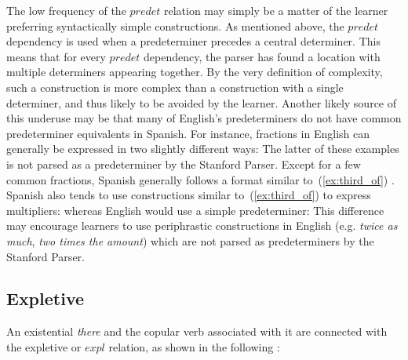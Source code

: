 \documentclass[main.tex]{subfiles}
\begin{document}
The low frequency of the $predet$ relation may simply be a matter of the learner preferring syntactically simple constructions. As mentioned above, the $predet$ dependency is used when a predeterminer precedes a central determiner. This means that for every $predet$ dependency, the parser has found a location with multiple determiners appearing together. By the very definition of complexity, such a construction is more complex than a construction with a single determiner, and thus likely to be avoided by the learner. Another likely source of this underuse may be that many of English's predeterminers do not have common predeterminer equivalents in Spanish. For instance, fractions in English can generally be expressed in two slightly different ways:
The latter of these examples is not parsed as a predeterminer by the Stanford Parser. Except for a few common fractions, Spanish generally follows a format similar to~(\ref{ex:third_of}) \citep[pp. 122-3]{butt}. Spanish also tends to use constructions similar to~(\ref{ex:third_of}) to express multipliers:
whereas English would use a simple predeterminer:
This difference may encourage learners to use periphrastic constructions in English (e.g. \textit{twice as much}, \textit{two times the amount}) which are not parsed as predeterminers by the Stanford Parser.

\subsection{Expletive}

An existential \textit{there} and the copular verb associated with it are connected with the expletive or $expl$ relation, as shown in the following \citep[pp. 126-7]{quirk:1985}: 
\newline\newline{}
\newline
\end{document}
